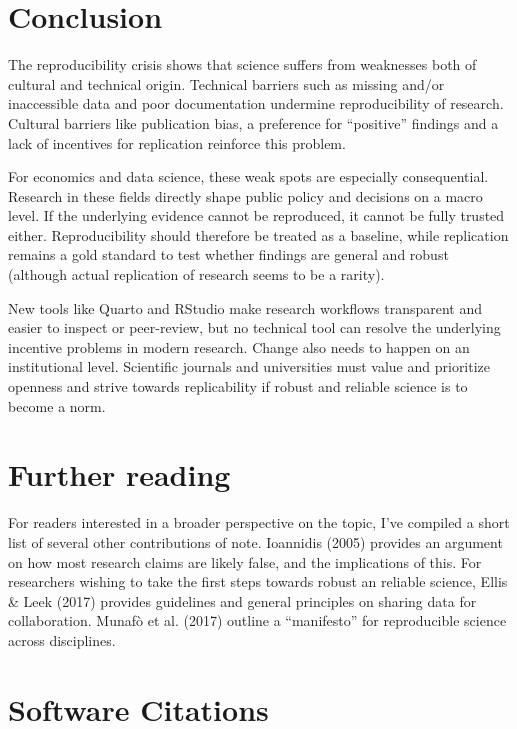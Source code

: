 \documentclass[
  a4paper,
]{article}
\begin{document}
\section{Conclusion}\label{conclusion}

The reproducibility crisis shows that science suffers from weaknesses
both of cultural and technical origin. Technical barriers such as
missing and/or inaccessible data and poor documentation undermine
reproducibility of research. Cultural barriers like publication bias, a
preference for ``positive'' findings and a lack of incentives for
replication reinforce this problem.

For economics and data science, these weak spots are especially
consequential. Research in these fields directly shape public policy and
decisions on a macro level. If the underlying evidence cannot be
reproduced, it cannot be fully trusted either. Reproducibility should
therefore be treated as a baseline, while replication remains a gold
standard to test whether findings are general and robust (although
actual replication of research seems to be a rarity).

New tools like Quarto and RStudio make research workflows transparent
and easier to inspect or peer-review, but no technical tool can resolve
the underlying incentive problems in modern research. Change also needs
to happen on an institutional level. Scientific journals and
universities must value and prioritize openness and strive towards
replicability if robust and reliable science is to become a norm.

\section{Further reading}\label{further-reading}

For readers interested in a broader perspective on the topic, I've
compiled a short list of several other contributions of note. Ioannidis
(2005) provides an argument on how most research claims are likely
false, and the implications of this. For researchers wishing to take the
first steps towards robust an reliable science, Ellis \& Leek (2017)
provides guidelines and general principles on sharing data for
collaboration. Munafò et al. (2017) outline a ``manifesto'' for
reproducible science across disciplines.

\section{Software Citations}\label{software-citations}
\end{document}

